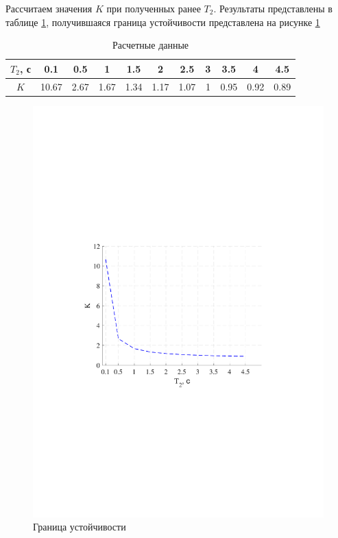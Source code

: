 \documentclass[a4paper,12pt]{article}
\begin{document}
	 Рассчитаем значения $K$ при полученных ранее $T_2$. Результаты представлены в таблице \ref{t_2}, получившаяся граница устойчивости представлена на рисунке \ref{s_4}
	 \begin{table}[h]
	 	\caption{Расчетные данные}
	 	\renewcommand{\arraystretch}{2} 
	 	\renewcommand{\tabcolsep}{0.4cm}
	 	\begin{center}
	 		\begin{tabular}{|c|c|c|c|c|c|c|c|c|c|c|}
	 			\hline
	 			$T_2$, с & 0.1 & 0.5 & 1 & 1.5 & 2 & 2.5 & 3 & 3.5 & 4 & 4.5 \\ \hline
	 			$K$ & 10.67 & 2.67 & 1.67 & 1.34 & 1.17 & 1.07 & 1 & 0.95 & 0.92 & 0.89 \\ \hline
	 		\end{tabular}
	 	\end{center}
	 	\label{t_2}
	 \end{table}
	 
	 \begin{figure}[h]
	 	\renewcommand{\figurename}{Рисунок}
	 	\centering
	 	\includegraphics[width=6in]{RaschetMOD.pdf}
	 	\caption{Граница устойчивости}
	 	\label{s_4}
	 \end{figure}
 
\end{document}

